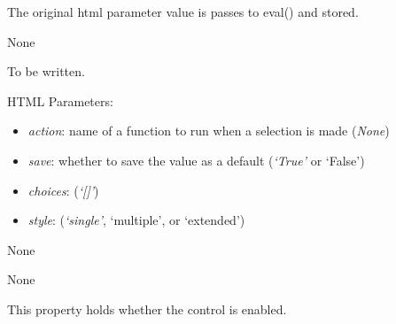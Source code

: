 \documentclass[letterpaper,10pt,english]{sphinxmanual}
\begin{document}
\begin{fulllineitems}
\begin{fulllineitems}
The original html parameter value is passes to eval() and stored.

\end{fulllineitems}


\begin{fulllineitems}
\label{api:controls.CheckBox.value}
None

\end{fulllineitems}


\end{fulllineitems}


\begin{fulllineitems}
\label{api:controls.ChoiceBox}
To be written.

HTML Parameters:
\begin{itemize}
\item {} 
\emph{action}: name of a function to run when a selection is made (\emph{None})

\item {} 
\emph{save}: whether to save the value as a default (\emph{`True'} or `False')

\item {} 
\emph{choices}: (\emph{`{[}{]}'})

\item {} 
\emph{style}: (\emph{`single'}, `multiple', or `extended')

\end{itemize}

\begin{fulllineitems}
\label{api:controls.ChoiceBox.action}
None

\end{fulllineitems}


\begin{fulllineitems}
\label{api:controls.ChoiceBox.choices}
None

\end{fulllineitems}


\begin{fulllineitems}
\label{api:controls.ChoiceBox.enabled}
This property holds whether the control is enabled.


\end{fulllineitems}
\end{fulllineitems}
\end{document}
